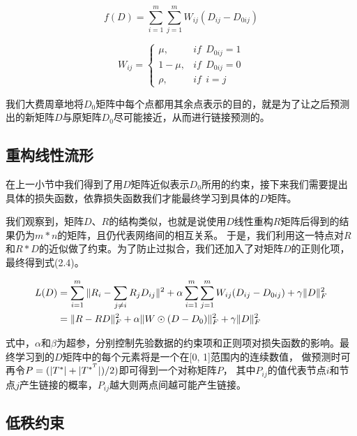 \begin{equation}
    f(D)=\sum^m_{i=1}\sum^m_{j=1}W_{ij}(D_{ij}-D_{0ij})
\end{equation}


\begin{equation}
    W_{ij}=\begin{cases}
        \mu,& if\ \ D_{0ij} = 1 \\
        1 - \mu,& if\ \ D_{0ij} = 0 \\
        \rho,& if\ \ i = j
        \end{cases}
\end{equation}


我们大费周章地将$D_0$矩阵中每个点都用其余点表示的目的，就是为了让之后预测出的新矩阵$D$与原矩阵$D_0$尽可能接近，从而进行链接预测的。

\subsection{重构线性流形}

在上一小节中我们得到了用$D$矩阵近似表示$D_0$所用的约束，接下来我们需要提出具体的损失函数，依靠损失函数我们才能最终学习到具体的$D$矩阵。


我们观察到，矩阵$D$、$R$的结构类似，也就是说使用$D$线性重构$R$矩阵后得到的结果仍为$m*n$的矩阵，且仍代表网络间的相互关系。
于是，我们利用这一特点对$R$和$R*D$的近似做了约束。为了防止过拟合，我们还加入了对矩阵$D$的正则化项，最终得到式(2.4)。


\begin{align}
L(D)&=\sum_{i=1}^m\Arrowvert{R_i-\sum_{j\neq{i}} R_jD_{ij} }\Arrowvert^2 + 
\alpha\sum_{i=1}^m\sum_{j=1}^mW_{ij}(D_{ij}-D_{0ij})+\gamma\Arrowvert{D}\Arrowvert_F^2\nonumber \\
    &= \Arrowvert{R-RD}\Arrowvert_F^2+\alpha\Arrowvert{W}\odot(D-D_0)\Arrowvert_F^2+\gamma\Arrowvert{D}\Arrowvert_F^2
\end{align}

式中，$\alpha$和$\beta$为超参，分别控制先验数据的约束项和正则项对损失函数的影响。最终学习到的$D$矩阵中的每个元素将是一个在[0, 1]范围内的连续数值，
做预测时可再令$P=(\arrowvert{T^*}\arrowvert+\arrowvert{T^{*^T}}\arrowvert)/2)$即可得到一个对称矩阵$P$，
其中$P_{ij}$的值代表节点$i$和节点$j$产生链接的概率，$P_{ij}$越大则两点间越可能产生链接。


\subsection{低秩约束}

